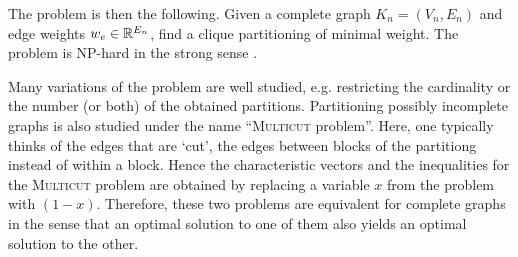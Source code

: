 The \CP problem is then the following.
Given a complete graph $K_n=(V_n,E_n)$ and edge weights $w_e \in \mathbb{R}^{E_n}$, find a clique partitioning of minimal weight.
The problem is \textsc{NP}-hard in the strong sense .



Many variations of the problem are well studied, e.g. restricting the cardinality or the number (or both) of the obtained partitions.
Partitioning possibly incomplete graphs is also studied under the name “\textsc{Multicut} problem”.
Here, one typically thinks of the edges that are ‘cut’, \ie the edges between blocks of the partitiong instead of within a block.
Hence the characteristic vectors and the inequalities for the \textsc{Multicut} problem are obtained by replacing a variable $x$ from the \CP problem with $(1-x)$.
Therefore, these two problems are equivalent for complete graphs in the sense that an optimal solution to one of them also yields an optimal solution to the other.
